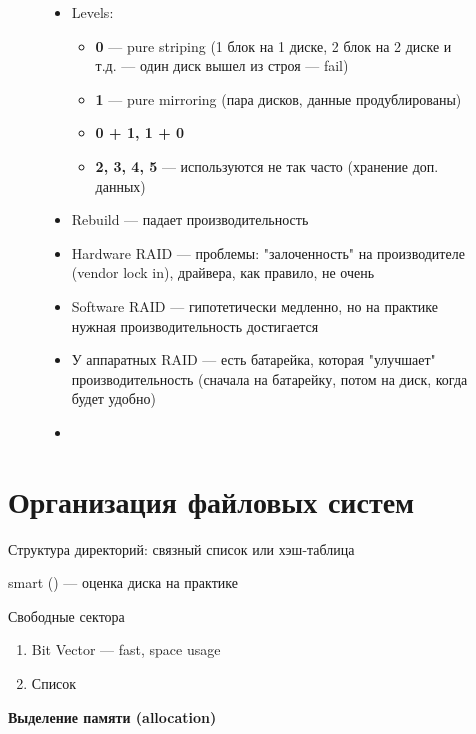 \documentclass[../../lectures.tex]{subfiles}
\begin{document}
\begin{figure}[H]
\begin{minipage}[c]{0.5\linewidth}
\begin{itemize}
    \item Levels:
        \begin{itemize}
            \item \textbf{0} --- pure striping (1 блок на 1 диске, 2 блок на 2 диске и т.д. --- один диск вышел из строя --- fail)
            \item \textbf{1} --- pure mirroring (пара дисков, данные продублированы)
            \item \textbf{0 + 1, 1 + 0}
            \item \textbf{2, 3, 4, 5} --- используются не так часто (хранение доп. данных)
        \end{itemize}
    \item Rebuild --- падает производительность
    \item Hardware RAID --- проблемы: "залоченность" на производителе (vendor lock in), драйвера, как правило, не очень
    \item Software RAID --- гипотетически медленно, но на практике нужная производительность достигается
    \item У аппаратных RAID --- есть батарейка, которая "улучшает" производительность 
          (сначала на батарейку, потом на диск, когда будет удобно)
    \item {}
\end{itemize}
\end{minipage}
\end{figure}

\newpage
\section{Организация файловых систем}
Структура директорий: связный список или хэш-таблица

smart () --- оценка диска на практике

Свободные сектора
\begin{enumerate}
    \item Bit Vector --- fast, space usage
    \item Список
\end{enumerate}

\begin{center}\textbf{Выделение памяти (allocation)}\end{center}
\end{document}
